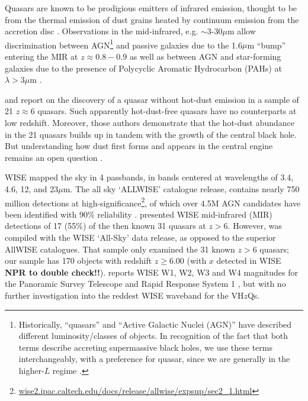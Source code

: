 \documentclass[usenatbib]{mnras}
\begin{document}
Quasars are known to be prodigious emitters of infrared emission,
thought to be from the thermal emission of dust grains heated by
continuum emission from the accretion disc
\citep[e.g.,][]{Richards2006b, Leipski2014, Hill2014, Hickox2017}.
Observations in the mid-infrared, e.g. $\sim$3-30$\mu$m allow
discrimination between AGN\footnote{Historically, ``quasars'' and
``Active Galactic Nuclei (AGN)'' have described different
luminosity/classes of objects. In recognition of the
fact that both terms describe accreting supermassive black holes, 
we use these terms interchangeably, with a preference for quasar, 
since we are generally in the higher-$L$ regime
\citep[e.g.][]{Haardt2016book}.}  and passive galaxies due to the
1.6$\mu$m ``bump'' entering the MIR at $z\approx0.8-0.9$ \citep[e.g.,
][]{Wright1994, Sawicki2002, Lacy2004, Stern2005, Richards2006b,
Timlin2016} as well as between AGN and star-forming galaxies due to
the presence of Polycyclic Aromatic Hydrocarbon (PAHs) at $\lambda
>3\mu$m \citep[e.g., ][]{Yan2007, Tielens2008}.

\citet{Jiang2006dust} and \citet{Jiang2010} report on the discovery of a quasar without hot-dust emission in a sample of 21 $z\approx6$ quasars. Such apparently hot-dust-free quasars have no counterparts at low redshift. Moreover, those authors demonstrate that the hot-dust abundance in the 21 quasars builds up in tandem with the growth of the central black hole. But understanding how dust first forms and appears in the central engine remains an open question \citep{WangR2008, WangR2011}. 

WISE mapped the sky in 4 passbands, in bands centered at wavelengths of 3.4, 4.6, 12, and 23$\mu$m. The all sky `ALLWISE' catalogue release, contains nearly 750 million detections at high-significance\footnote{\href{wise2.ipac.caltech.edu/docs/release/allwise/expsup/sec2\_1.html}{wise2.ipac.caltech.edu/docs/release/allwise/expsup/sec2\_1.html}}, of which over 4.5M AGN candidates have been identified with 90\% reliability \citep{Assef2018}.  \citet{Blain2013} presented WISE mid-infrared (MIR) detections of 17 (55\%) of the then known 31 quasars at $z > 6$. However, \citet{Blain2013} was compiled with the WISE `All-Sky' data release, as opposed to the superior AllWISE catalogues. That sample only examined the 31 known $z>6$ quasars; our sample has 170 objects with redshift $z \geq 6.00$ (with $x$ detected in WISE {\bf NPR to double check!!}). \citet{Banados2016} reports WISE W1, W2, W3 and W4 magnitudes for the Panoramic Survey Telescope and Rapid Response System 1 \citep[Pan-STARRS1, PS1;][]{Kaiser2002, Kaiser2010}, but with no further investigation into the reddest WISE waveband for the VH$z$Qs. 
\end{document}
